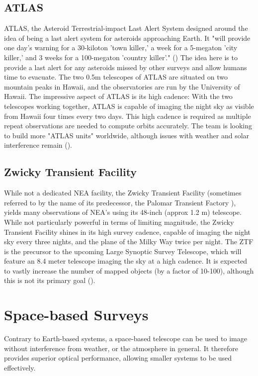 \subsection{ATLAS}
\label{ssec:ATLAS}
ATLAS, the Asteroid Terrestrial-impact Last Alert System designed around the idea of being a last alert system for asteroids approaching Earth. It "will provide one day's warning for a 30-kiloton 'town killer,' a week for a 5-megaton 'city killer,' and 3 weeks for a 100-megaton 'country killer'." (\cite{Atlasite}) The idea here is to provide a last alert for any asteroids missed by other surveys and allow humans time to evacuate. The two 0.5m telescopes of ATLAS are situated on two mountain peaks in Hawaii, and the observatories are run by the University of Hawaii. The impressive aspect of ATLAS is its high cadence: With the two telescopes working together, ATLAS is capable of imaging the night sky as visible from Hawaii four times every two days. This high cadence is required as multiple repeat observations are needed to compute orbits accurately. The team is looking to build more "ATLAS units" worldwide, although issues with weather and solar interference remain (\cite{ATLAS}).

\subsection{Zwicky Transient Facility}
\label{ssec:palomar}
While not a dedicated NEA facility, the Zwicky Transient Facility (sometimes referred to by the name of its predecessor, the Palomar Transient Factory ), yields many observations of NEA's using its 48-inch (approx 1.2 m) telescope. While not particularly powerful in terms of limiting magnitude, the Zwicky Transient Facility shines in its high survey cadence, capable of imaging the night sky every three nights, and the plane of the Milky Way twice per night. The ZTF is the precursor to the upcoming Large Synoptic Survey Telescope, which will feature an 8.4 meter telescope imaging the sky at a high cadence. It is expected to vastly increase the number of mapped objects (by a factor of 10-100), although this is not its primary goal (\cite{LSST}).

\section{Space-based Surveys}

Contrary to Earth-based systems, a space-based telescope can be used to image without interference from weather, or the atmosphere in general. It therefore provides superior optical performance, allowing smaller systems to be used effectively.

